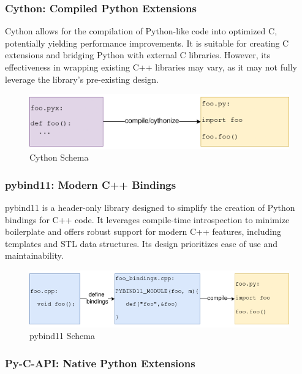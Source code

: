 \subsubsection{Cython: Compiled Python Extensions}

Cython allows for the compilation of Python-like code into optimized C, potentially yielding performance improvements. It is suitable for creating C extensions and bridging Python with external C libraries. However, its effectiveness in wrapping existing C++ libraries may vary, as it may not fully leverage the library's pre-existing design. \cite{cython-docu}

\begin{figure}[htpb]
    \centering
    \includegraphics[width=\textwidth]{figures/cython_schema.png}
    \caption{Cython Schema}
    \label{fig:cython-schema}
\end{figure}

\subsubsection{pybind11: Modern C++ Bindings}

pybind11 is a header-only library designed to simplify the creation of Python bindings for C++ code. It leverages compile-time introspection to minimize boilerplate and offers robust support for modern C++ features, including templates and \ac{STL} data structures. Its design prioritizes ease of use and maintainability. \cite {pybind11-docu}

\begin{figure}[htpb]
    \centering
    \includegraphics[width=\textwidth]{figures/pybind_schema.png}
    \caption{pybind11 Schema}
    \label{fig:pybind11-schema}
\end{figure}

\subsubsection{Py-C-API: Native Python Extensions}

